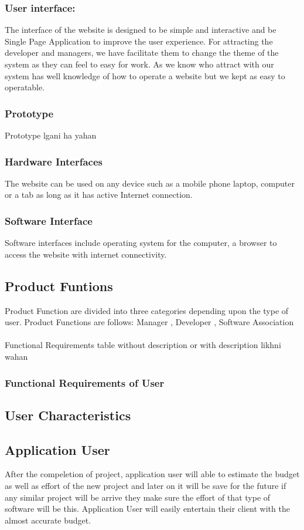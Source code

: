     \subsubsection{User interface: }
    The interface of the website is designed to be simple and interactive and be Single Page Application to improve the user experience. 
    For attracting the developer and managers, we have facilitate them to change the theme of the system as they can feel to easy for work.
    As we know who attract with our system has well knowledge of how to operate a website but we kept as easy to operatable.
    \subsubsection{Prototype}
    {\huge Prototype lgani ha yahan}
    \subsubsection{Hardware Interfaces}
    The website can be used on any device such as a mobile phone laptop, computer or a tab as long as it has active Internet connection.
    \subsubsection{Software Interface}
    Software interfaces include operating system for the computer, a browser to access the website with internet connectivity.
\subsection{Product Funtions}
    Product Function are divided into three categories depending upon the type of user. Product Functions are follows:
    Manager , Developer , Software Association
   \\ \\ {\huge Functional Requirements table without description  or with description likhni wahan  \\ }
    \subsubsection{Functional Requirements of User}
    


\subsection{User Characteristics}
\subsection*{Application User}
After the compeletion of project, application user will able to estimate the budget as well as effort of the new project and later on it will be save for the future if any similar project will be arrive they make sure the effort of that type of software will be this.
Application User will easily entertain their client with the almost accurate budget. 
